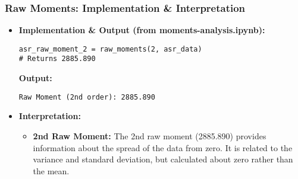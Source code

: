 \begin{frame}[fragile]
    \frametitle{Raw Moments: Implementation \& Interpretation}
    \begin{itemize}
        \item \textbf{Implementation \& Output (from moments-analysis.ipynb):}
              \begin{lstlisting}
asr_raw_moment_2 = raw_moments(2, asr_data) 
# Returns 2885.890
        \end{lstlisting}
              \textbf{Output:}
              \begin{verbatim}
Raw Moment (2nd order): 2885.890
        \end{verbatim}

        \item \textbf{Interpretation:}
              \begin{itemize}
                  \item \textbf{2nd Raw Moment:} The 2nd raw moment (2885.890) provides information about the spread of the data from zero. It is related to the variance and standard deviation, but calculated about zero rather than the mean.
              \end{itemize}
    \end{itemize}
\end{frame}